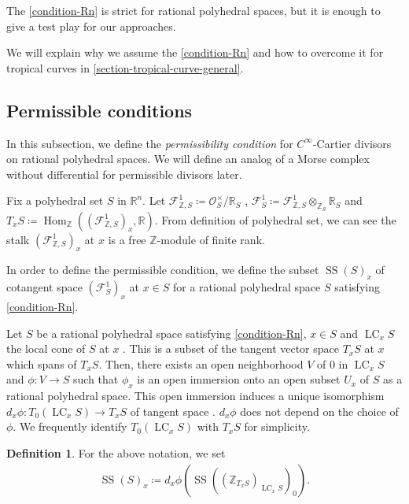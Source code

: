 \documentclass[a4paper,dvipdfmx,reqno,12pt]{amsart}
\theoremstyle{definition}
\newtheorem{definition}[theorem]{Definition}
\newcommand{\deq}{\coloneqq}
\newcommand{\opn}[1]{\operatorname{#1}}
\numberwithin{equation}{section}
\begin{document}
The \cref{condition-Rn} is strict for rational polyhedral
spaces, but it is enough to
give a test play for our approaches.


We will explain why we assume the \cref{condition-Rn}
and how to overcome it
for tropical curves in 
\cref{section-tropical-curve-general}.

\subsection{Permissible conditions}

In this subsection, we define 
the \emph{permissibility condition} for
$C^{\infty}$-Cartier divisors on rational 
polyhedral spaces.
We will define an analog of a Morse complex
without differential for permissible divisors 
later.

Fix a polyhedral set $S$ 
in $\mathbb{R}^{n}$.
Let 
$\mathcal{F}^{1}_{\mathbb{Z},S}
\deq \mathcal{O}^{\times}_S/\mathbb{R}_{S}$
,
$\mathcal{F}^{1}_{S}\deq 
\mathcal{F}^{1}_{\mathbb{Z},S}
\otimes_{\mathbb{Z}_S} \mathbb{R}_S$ 
and $T_x S\deq \opn{Hom}_{\mathbb{Z}}(
(\mathcal{F}^{1}_{\mathbb{Z},S})_x,\mathbb{R})$.
From definition of polyhedral set, 
we can see 
the stalk $(\mathcal{F}^{1}_{\mathbb{Z},S})_x$
at $x$ is a free 
$\mathbb{Z}$-module of finite rank.

In order to define the permissible condition,
we define the subset $\opn{SS}(S)_x$ of cotangent
space $(\mathcal{F}^{1}_{S})_x$ at $x\in S$ for 
a rational polyhedral
space $S$ satisfying \cref{condition-Rn}.


Let $S$ be a rational polyhedral space satisfying
\cref{condition-Rn}, $x\in S$ and $\opn{LC}_x S$ the 
local cone of $S$ at $x$ 
\cite[2.2]{gross2019sheaftheoretic}.
This is a subset of the tangent vector space
$T_{x}S$ at $x$ which spans of $T_{x}S$.
Then, there exists an open neighborhood 
$V$ of $0$ in $\opn{LC}_x S$ and $\phi \colon V\to S$ 
such that $\phi_x$ is an open immersion onto an 
open subset $U_x$ of $S$ as a 
rational polyhedral space.
This open immersion induces a unique isomorphism
$d_x\phi\colon T_0(\opn{LC}_xS) \to T_x S$
of tangent space 
\cite[Proposition 2.5]{gross2019sheaftheoretic}.
$d_x \phi$ does not depend on the choice of 
$\phi$. We frequently identify $T_0(\opn{LC}_x S)$ with 
$T_x S$ for simplicity.
\begin{definition}
For the above notation, we set
\begin{align}
\opn{SS}(S)_x\deq 
d_x\phi(\opn{SS}((\mathbb{Z}_{T_x S})_{\opn{LC}_x S})_0).
\end{align}

\end{definition}
\end{document}

